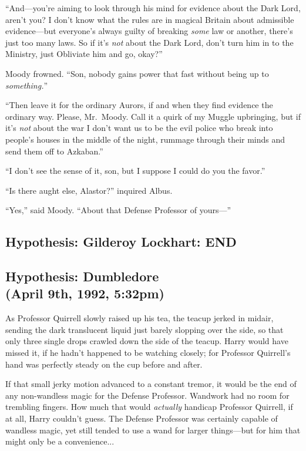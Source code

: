 “And—you’re aiming to look through his mind for evidence about the Dark Lord, aren’t you? I don’t know what the rules are in magical Britain about admissible evidence—but everyone’s always guilty of breaking \emph{some} law or another, there’s just too many laws. So if it’s \emph{not} about the Dark Lord, don’t turn him in to the Ministry, just Obliviate him and go, okay?”

Moody frowned. “Son, nobody gains power that fast without being up to \emph{something.}”

“Then leave it for the ordinary Aurors, if and when they find evidence the ordinary way. Please, Mr.~Moody. Call it a quirk of my Muggle upbringing, but if it’s \emph{not} about the war I don’t want us to be the evil police who break into people’s houses in the middle of the night, rummage through their minds and send them off to Azkaban.”

“I don’t see the sense of it, son, but I suppose I could do you the favor.”

“Is there aught else, Alastor?” inquired Albus.

“Yes,” said Moody. “About that Defense Professor of yours—”

\subsection*{Hypothesis: Gilderoy Lockhart: END}
\sbreak

\subsection{Hypothesis: Dumbledore\\(April 9th, 1992, 5:32pm)}

As Professor Quirrell slowly raised up his tea, the teacup jerked in midair, sending the dark translucent liquid just barely slopping over the side, so that only three single drops crawled down the side of the teacup. Harry would have missed it, if he hadn’t happened to be watching closely; for Professor Quirrell’s hand was perfectly steady on the cup before and after.

If that small jerky motion advanced to a constant tremor, it would be the end of any non-wandless magic for the Defense Professor. Wandwork had no room for trembling fingers. How much that would \emph{actually} handicap Professor Quirrell, if at all, Harry couldn’t guess. The Defense Professor was certainly capable of wandless magic, yet still tended to use a wand for larger things—but for him that might only be a convenience...


